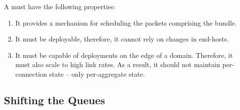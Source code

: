 A \name must have the following properties:
\begin{enumerate}
    \item It provides a mechanism for scheduling the packets comprising the bundle.
    \item It must be deployable, therefore, it cannot rely on changes in end-hosts.
    \item It must be capable of deployments on the edge of a domain. Therefore, it must also scale to high link rates. As a result, it should not maintain per-connection state -- only per-aggregate state. 
\end{enumerate}

\subsection{Shifting the Queues}\label{s:design:shifting}


